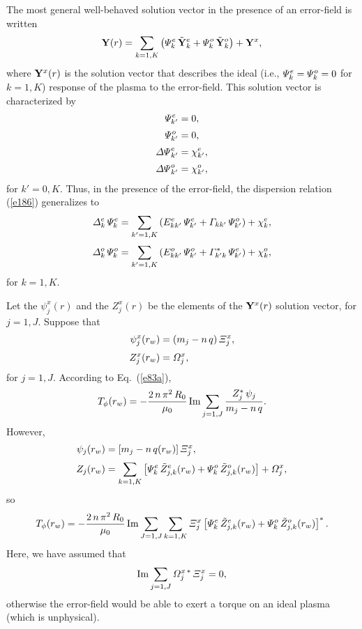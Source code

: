 \documentclass[12pt,prb,aps,notitlepage]{revtex4-1}
\begin{document}
The most general well-behaved solution vector in the presence of an error-field is written
\begin{equation}
{\bf Y}(r) = \sum_{k=1,K}\left({\mit\Psi}_k^e\,\tilde{\bf Y}_k^e + {\mit\Psi}_k^o\,\tilde{\bf Y}_k^o\right) + {\bf Y}^x,
\end{equation}
where ${\bf Y}^x(r)$ is the solution vector that describes the ideal  (i.e., ${\mit\Psi}_k^e={\mit\Psi}_k^o=0$ for $k=1,K$) response of the plasma to the error-field. 
This solution vector is characterized by
\begin{align}
{\mit\Psi}_{k'}^e &= 0,\\[0.5ex]
{\mit\Psi}_{k'}^o &=0,\\[0.5ex]
{\mit\Delta\Psi}_{k'}^e &= \chi_{k'}^e,\\[0.5ex]
{\mit\Delta\Psi}_{k'}^o &= \chi_{k'}^o,
\end{align}
for $k'=0,K$. 
Thus, in the presence of the error-field, the dispersion relation (\ref{e186})
generalizes to
\begin{align}\label{e200}
{\mit\Delta}_k^e\,{\mit\Psi}_k^e &= \sum_{k'=1,K}\left(E_{kk'}^e\,{\mit\Psi}_{k'}^e + {\mit\Gamma}_{kk'}\,{\mit\Psi}_{k'}^o\right) + \chi_k^e,\\[0.5ex]
{\mit\Delta}_k^o \,{\mit\Psi}_k^o&= \sum_{k'=1,K}\left(E_{kk'}^o\,{\mit\Psi}_{k'}^o + {\mit\Gamma}_{k'k}^\ast\,{\mit\Psi}_{k'}^e\right) + \chi_k^o,\label{e201}
\end{align}
for $k=1,K$. 

Let the $\psi_j^x(r)$ and the $Z_j^x(r)$ be the elements of the ${\bf Y}^x(r)$ solution vector, for $j=1,J$. 
Suppose that
\begin{align}
\psi_j^x (r_w) &= (m_j-n\,q)\,{\mit\Xi}_j^x,\\[0.5ex]
Z_j^x(r_w) &= {\mit\Omega}_j^x,
\end{align}
for $j=1,J$. 
According to Eq.~(\ref{e83a}),
\begin{equation}
T_\phi(r_w) = - \frac{2\,n\,\pi^2\,R_0}{\mu_0}\,{\rm Im}\sum_{j=1,J} \frac{Z_j^\ast\,\psi_j}{m_j-n\,q}.
\end{equation}
However, 
\begin{align}
\psi_j(r_w)& = [m_j-n\,q(r_w)]\,{\mit\Xi}_j^x,\\[0.5ex]
Z_j(r_w) &=  \sum_{k=1,K}\left[{\mit\Psi}_k^e\,\tilde{Z}_{j,k}^e(r_w) + {\mit\Psi}_k^o\,\tilde{Z}_{j,k}^o(r_w)\right]+ {\mit\Omega}_j^x,
\end{align}
so
\begin{equation}\label{e218}
T_\phi(r_w) = -\frac{2\,n\,\pi^2\,R_0}{\mu_0}\,{\rm Im}\sum_{J=1,J}\sum_{k=1,K} 
{\mit\Xi}_j^x\left[{\mit\Psi}_k^e\,\tilde{Z}_{j,k}^e(r_w) + {\mit\Psi}_k^o\,\tilde{Z}_{j,k}^o(r_w)\right]^\ast.
\end{equation}
Here, we have assumed that
\begin{equation}
{\rm Im}\sum_{j=1,J} {\mit\Omega}^{x\,\ast}_j\,{\mit\Xi}^x_j= 0,
\end{equation}
otherwise the error-field would be able to exert a torque on an ideal plasma (which is unphysical). 
\end{document}
